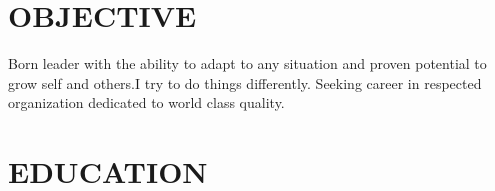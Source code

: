 \documentclass[margin, 12pt]{res} %
\begin{document}
\begin{resume}

 
\section{OBJECTIVE}  

Born leader with the ability to adapt to any situation and proven potential to grow self and others.I try to do things differently. Seeking career in respected organization dedicated to world class quality.


\section{EDUCATION}


\end{resume}
\end{document}
